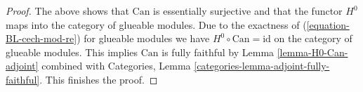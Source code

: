 \begin{proof}
\medskip\noindent
The above shows that $\text{Can}$ is essentially surjective and that
the functor $H^0$ maps into the category of glueable modules.
Due to the exactness of (\ref{equation-BL-cech-mod-re}) for glueable modules
we have $H^0 \circ \text{Can} = \text{id}$ on the
category of glueable modules. This implies $\text{Can}$ is fully
faithful by Lemma \ref{lemma-H0-Can-adjoint} combined with
Categories, Lemma \ref{categories-lemma-adjoint-fully-faithful}.
This finishes the proof.
\end{proof}
